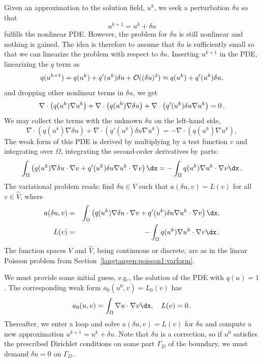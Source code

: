 Given an approximation to the solution field, $u^k$, we seek a
perturbation $\delta u$ so that
\begin{equation}
u^{k+1} = u^k + \delta u
\end{equation}
fulfills the nonlinear PDE.
However, the problem for $\delta u$ is still nonlinear and nothing is
gained. The idea is therefore to assume that $\delta u$ is sufficiently
small so that we can linearize the problem with respect to $\delta u$.
Inserting $u^{k+1}$ in the PDE,
linearizing the $q$ term as
\begin{equation}
q(u^{k+1}) = q(u^k) + q'(u^k)\delta u + {\cal O}((\delta u)^2)
\approx q(u^k) + q'(u^k)\delta u,
\end{equation}
and dropping other nonlinear terms in $\delta u$,
we get
\[
\nabla\cdot\left( q(u^k)\nabla u^k\right) +
\nabla\cdot\left( q(u^k)\nabla\delta u\right) +
\nabla\cdot\left( q'(u^k)\delta u\nabla u^k\right) = 0\thinspace .
\]
We may collect the terms with the unknown $\delta u$ on the left-hand side,
\begin{equation}
\nabla\cdot\left( q(u^k)\nabla\delta u\right) +
\nabla\cdot\left( q'(u^k)\delta u\nabla u^k\right) =
-\nabla\cdot\left( q(u^k)\nabla u^k\right),
\end{equation}
The weak form of this PDE is derived by multiplying by a test function $v$
and integrating over $\Omega$, integrating the second-order derivatives
by parts:
\begin{equation}
\int_\Omega \left(
q(u^k)\nabla\delta u\cdot \nabla v
+ q'(u^k)\delta u\nabla u^k\cdot \nabla v\right)\dx
= -\int_\Omega q(u^k)\nabla u^k\cdot \nabla v\dx\langtangenep
\end{equation}
The variational problem reads: find $\delta u\in V$ such that
$a(\delta u,v) = L(v)$ for all $v\in \hat V$, where
\begin{eqnarray}
a(\delta u,v) &=&
\int_\Omega \left(
q(u^k)\nabla\delta u\cdot \nabla v
+ q'(u^k)\delta u\nabla u^k\cdot \nabla v\right)\dx,
\label{langtangen:nonlinear:poisson:pdelevel:eqa}\\
L(v) &=& -
\int_\Omega q(u^k)\nabla u^k\cdot \nabla v\dx\langtangenep
\label{langtangen:nonlinear:poisson:pdelevel:eqL}
\end{eqnarray}
The function spaces $V$ and $\hat V$, being continuous or discrete,
are as in the
linear Poisson problem from Section~\ref{langtangen:poisson1:varform}.

We must provide some initial guess, e.g., the solution of the
PDE with $q(u)=1$. The corresponding weak form $a_0(u^0,v)=L_0(v)$
has
\[ a_0(u,v)=\int_\Omega\nabla u\cdot \nabla v\dx,\quad
L(v)=0\langtangenep\]
Thereafter, we enter a loop and solve
$a(\delta u,v)=L(v)$ for $\delta u$ and compute a new approximation
$u^{k+1} = u^k + \delta u$. Note that $\delta u$ is a correction, so if
$u^0$ satisfies the prescribed
Dirichlet conditions on some part $\Gamma_D$ of the boundary,
we must demand $\delta u=0$ on $\Gamma_D$.

